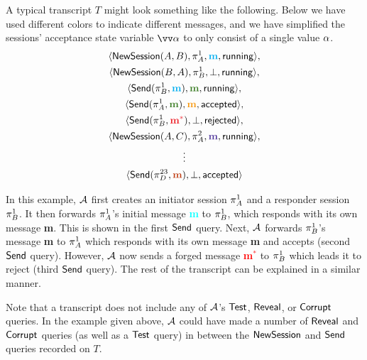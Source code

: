 \begin{example}
A typical transcript $T$ might look something like the following.
Below we have used different colors to indicate different messages,
and we have simplified the sessions' acceptance state variable $\vrunstate$ to only consist of a single value $\alpha$.
\begin{gather*}
	\langle \NewSession(A, B),\oracle[A][1], \textcolor{Cyan}{\mathbf{m}}, \running \rangle, \\
	\langle \NewSession(B,A),\oracle[B][1], \bot, \running \rangle, \\
	\langle \Send(\oracle[B][1], \textcolor{Cyan}{\mathbf{m}}), \textcolor{OliveGreen}{\mathbf{m}}, \running \rangle, \\
	\langle \Send(\oracle[A][1], \textcolor{OliveGreen}{\mathbf{m}}), \textcolor{YellowOrange}{\mathbf{m}}, \accepted \rangle, \\
	\langle \Send(\oracle[B][1], \textcolor{Red}{\mathbf{m}^*}), \bot, \rejected \rangle, \\
	\langle \NewSession(A, C),\oracle[A][2], \textcolor{Violet}{\mathbf{m}}, \running \rangle, \\
								\vdots \\
	\langle \Send(\oracle[D][23], \textcolor{Bittersweet}{\mathbf{m}}), \bot, \accepted \rangle
\end{gather*}

In this example, $\mathcal{A}$ first creates an initiator session $\oracle[A][1]$ and a responder session $\oracle[B][1]$.
It then forwards $\oracle[A][1]$'s initial message \textcolor{Cyan}{\textbf{m}} to $\oracle[B][1]$,
which responds with its own message \textcolor{OliveGreen}{\textbf{m}}.
This is shown in the first $\mathsf{Send}$ query.
Next,
$\mathcal{A}$ forwards $\oracle[B][1]$'s message \textcolor{OliveGreen}{\textbf{m}} to $\oracle[A][1]$ which responds with its own message \textcolor{YellowOrange}{\textbf{m}} and accepts (second $\mathsf{Send}$ query).
However,
$\mathcal{A}$ now sends a forged message \textcolor{Red}{\textbf{m}$^*$} to $\oracle[B][1]$ which leads it to reject (third $\mathsf{Send}$ query).
The rest of the transcript can be explained in a similar manner.
\end{example}

Note that a transcript does not include any of $\mathcal{A}$'s $\mathsf{Test}$, $\mathsf{Reveal}$, or $\mathsf{Corrupt}$ queries.
In the example given above, 
$\mathcal{A}$ could have made a number of $\mathsf{Reveal}$ and $\mathsf{Corrupt}$ queries (as well as a $\mathsf{Test}$ query) in between the $\mathsf{NewSession}$ and $\mathsf{Send}$ queries recorded on $T$.

